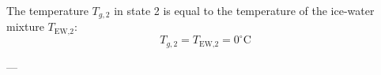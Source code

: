 The temperature \( T_{g,2} \) in state 2 is equal to the temperature of the ice-water mixture \( T_{\text{EW,2}} \):  
\[
T_{g,2} = T_{\text{EW,2}} = 0^\circ\text{C}
\]  

---